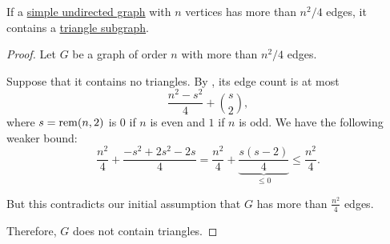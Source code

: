 \begin{theorem}\label{thm:mantel_theorem}
  If a \hyperref[def:undirected_graph]{simple undirected graph} with \( n \) vertices has more than \( n^2 / 4 \) edges, it contains a \hyperref[def:triangle_graph]{triangle subgraph}.
\end{theorem}
\begin{proof}
  Let \( G \) be a graph of order \( n \) with more than \( n^2 / 4 \) edges.

  Suppose that it contains no triangles. By , its edge count is at most
  \begin{equation*}
    \frac {n^2 - s^2} 4 + \binom s 2,
  \end{equation*}
  where \( s = \operatorname{rem}(n, 2) \) is \( 0 \) if \( n \) is even and \( 1 \) if \( n \) is odd. We have the following weaker bound:
  \begin{equation*}
    \frac {n^2} 4 + \frac {-s^2 + 2s^2 - 2s} 4
    =
    \frac {n^2} 4 + \underbrace{\frac {s(s - 2)} 4}_{\leq 0}
    \leq
    \frac {n^2} 4.
  \end{equation*}

  But this contradicts our initial assumption that \( G \) has more than \( \frac {n^2} 4 \) edges.

  Therefore, \( G \) does not contain triangles.
\end{proof}
